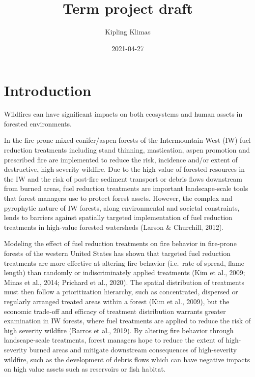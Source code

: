 \documentclass[]{book}
\title{Term project draft}
\author{Kipling Klimas}
\date{2021-04-27}
\begin{document}
\maketitle

{
\setcounter{tocdepth}{1}
\tableofcontents
}
\hypertarget{introduction}{%
\chapter{Introduction}\label{introduction}}

Wildfires can have significant impacts on both ecosystems and human assets in forested environments.

In the fire-prone mixed conifer/aspen forests of the Intermountain West (IW) fuel reduction treatments including stand thinning, mastication, aspen promotion and prescribed fire are implemented to reduce the risk, incidence and/or extent of destructive, high severity wildfire. Due to the high value of forested resources in the IW and the risk of post-fire sediment transport or debris flows downstream from burned areas, fuel reduction treatments are important landscape-scale tools that forest managers use to protect forest assets. However, the complex and pyrophytic nature of IW forests, along environmental and societal constraints, lends to barriers against spatially targeted implementation of fuel reduction treatments in high-value forested watersheds (Larson \& Churchill, 2012).

Modeling the effect of fuel reduction treatments on fire behavior in fire-prone forests of the western United States has shown that targeted fuel reduction treatments are more effective at altering fire behavior (i.e.~rate of spread, flame length) than randomly or indiscriminately applied treatments (Kim et al., 2009; Minas et al., 2014; Prichard et al., 2020). The spatial distribution of treatments must then follow a prioritization hierarchy, such as concentrated, dispersed or regularly arranged treated areas within a forest (Kim et al., 2009), but the economic trade-off and efficacy of treatment distribution warrants greater examination in IW forests, where fuel treatments are applied to reduce the risk of high severity wildfire (Barros et al., 2019). By altering fire behavior through landscape-scale treatments, forest managers hope to reduce the extent of high-severity burned areas and mitigate downstream consequences of high-severity wildfire, such as the development of debris flows which can have negative impacts on high value assets such as reservoirs or fish habitat.
\end{document}
